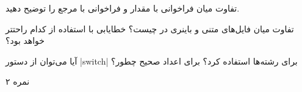\documentclass[../main.tex]{subfiles}
\begin{document}
تفاوت میان فراخوانی با مقدار و فراخوانی با مرجع را توضیح دهید.

تفاوت میان فایل‌های متنی و باینری در چیست؟ خطایابی با استفاده از کدام راحتتر خواهد بود؟

آیا می‌توان از دستور |switch‌| برای رشته‌ها استفاده کرد؟ برای اعداد صحیح چطور؟

۲ نمره
\end{document}

